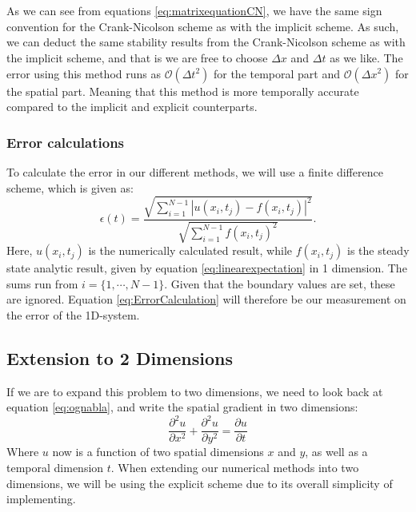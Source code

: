 \documentclass[reprint,english,notitlepage]{revtex4-1}  %
\begin{document}
\\
\\
As we can see from equations \ref{eq:matrixequationCN}, we have the same sign convention for the Crank-Nicolson scheme as with the implicit scheme. As such, we can deduct the same stability results from the Crank-Nicolson scheme as with the implicit scheme, and that is we are free to choose $\Delta x$ and $\Delta t$ as we like. The error using this method runs as $\mathcal{O}(\Delta t^2)$ for the temporal part and $\mathcal{O}(\Delta x^2)$ for the spatial part. Meaning that this method is more temporally accurate compared to the implicit and explicit counterparts.

\subsubsection{Error calculations}

To calculate the error in our different methods, we will use a finite difference scheme, which is given as:
\begin{equation}\label{eq:ErrorCalculation}
    \epsilon(t) = \frac{\sqrt{\sum\limits_{i=1}^{N-1} |u(x_i,t_j) - f(x_i,t_j)|^2 }}{\sqrt{\sum_{i=1}^{N-1} f(x_i,t_j)^2}}.
\end{equation}
Here, $u(x_i,t_j)$ is the numerically calculated result, while $f(x_i,t_j)$ is the steady state analytic result, given by equation \ref{eq:linearexpectation} in 1 dimension. The sums run from $i = \{1,\cdots,N-1\}$. Given that the boundary values are set, these are ignored. Equation \ref{eq:ErrorCalculation} will therefore be our measurement on the error of the 1D-system.

\subsection{Extension to 2 Dimensions} \label{sec:2D}

If we are to expand this problem to two dimensions, we need to look back at equation \ref{eq:ognabla}, and write the spatial gradient in two dimensions:
\begin{equation}\label{eq:2Danalytic}
    \frac{\partial^2 u}{\partial x^2} + \frac{\partial^2 u}{\partial y^2} = \frac{\partial u}{\partial t}
\end{equation}
Where $u$ now is a function of two spatial dimensions $x$ and $y$, as well as a temporal dimension $t$. When extending our numerical methods into two dimensions, we will be using the explicit scheme due to its overall simplicity of implementing.
\end{document}
